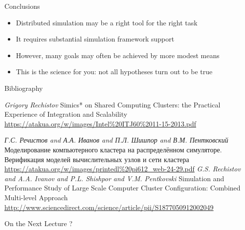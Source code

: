 \begin{frame}{Conclusions}
\begin{itemize}
\item Distributed simulation may be a right tool for the right task
\item It requires substantial simulation framework support 
\item However, many goals may often be achieved by more modest means
\item This is the science for you: not all hypotheses turn out to be true
\end{itemize}
\end{frame}

\begin{frame}[allowframebreaks]{Bibliography}
\begin{thebibliography}{99}

   \textit{Grigory Rechistov} Simics* on Shared Computing Clusters: the Practical Experience of Integration and Scalability \url{https://atakua.org/w/images/Intel\%20ITJ60\%2011-15-2013.pdf}
  
   \textit{Г.С. Речистов and А.А. Иванов and П.Л. Шишпор and В.М. Пентковский} Моделирование компьютерного кластера на распределённом симуляторе. Верификация моделей вычислительных узлов и сети кластера \url{https://atakua.org/w/images/printedl\%20pi612_web-24-29.pdf}
   \textit{G.S. Rechistov and A.A. Ivanov and P.L. Shishpor and V.M. Pentkovski} Simulation and Performance Study of Large Scale Computer Cluster Configuration: Combined Multi-level Approach \url{http://www.sciencedirect.com/science/article/pii/S1877050912002049}  

\end{thebibliography}
\end{frame}

\begin{frame}{On the Next Lecture}
?
\end{frame}

\finalslide



